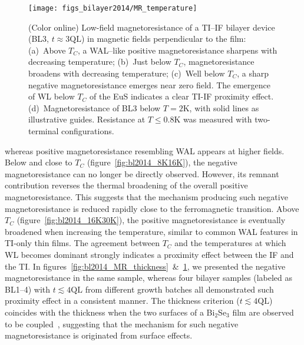 \begin{figure}[ht]%
\centering%
\subfloat{\label{fig:bl2014_16K30K}}%
\subfloat{\label{fig:bl2014_8K16K}}%
\subfloat{\label{fig:bl2014_2K8K}}%
\subfloat{\label{fig:bl2014_He3}}%
\texttt{[image: figs\_bilayer2014/MR\_temperature]}%
\caption[Magnetoresistance of a Bi$_2$Se$_3$--EuS bilayer in different temperature ranges]{\label{fig:bl2014_MR_temperature}(Color online) Low-field magnetoresistance of a TI--IF bilayer device (BL3, $t\approx3\mathrm{QL}$) in magnetic fields perpendicular to the film: (a)~Above $T_C$, a WAL--like positive magnetoresistance sharpens with decreasing temperature; (b)~Just below $T_C$, magnetoresistance broadens with decreasing temperature; (c)~Well below $T_C$, a sharp negative magnetoresistance emerges near zero field. The emergence of WL below $T_C$ of the EuS indicates a clear TI-IF proximity effect. (d)~Magnetoresistance of BL3 below $T=2$K, with solid lines as illustrative guides. Resistance at $T\leq0.8\mathrm{K}$ was measured with two-terminal configurations.}
\end{figure}%
%
whereas positive magnetoresistance resembling WAL appears at higher fields. Below and close to $T_C$ (figure~\ref{fig:bl2014_8K16K}), the negative magnetoresistance can no longer be directly observed. However, its remnant contribution reverses the thermal broadening of the overall positive magnetoresistance. This suggests that the mechanism producing such negative magnetoresistance is reduced rapidly close to the ferromagnetic transition. Above $T_C$ (figure~\ref{fig:bl2014_16K30K}), the positive magnetoresistance is eventually broadened when increasing the temperature, similar to common WAL features in TI-only thin films. The agreement between $T_C$ and the temperatures at which WL becomes dominant strongly indicates a proximity effect between the IF and the TI. In figures~\ref{fig:bl2014_MR_thickness}~\&~\ref{fig:bl2014_MR_temperature}, we presented the negative magnetoresistance in the same sample, whereas four bilayer samples (labeled as BL1--4) with $t\lesssim4\mathrm{QL}$ from different growth batches all demonstrated such proximity effect in a consistent manner. The thickness criterion ($t\lesssim4\mathrm{QL}$) coincides with the thickness when the two surfaces of a Bi$_2$Se$_3$ film are observed to be coupled~\cite{ARPES_thickness}, suggesting that the mechanism for such negative magnetoresistance is originated from surface effects.

